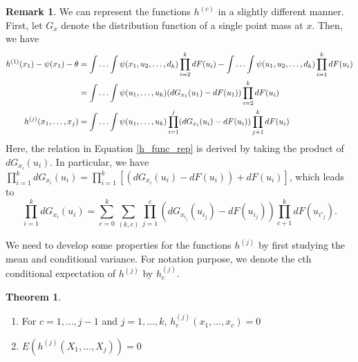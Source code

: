 \documentclass{article}
\theoremstyle{definition}
\newtheorem{theorem}{Theorem}
\numberwithin{Def}{section}
\newtheorem{Rmk}{Remark}
\begin{document}
\begin{Rmk}
We can represent the functions $h^{(c)}$ in a slightly different manner. First, let $G_x$ denote the distribution function of a single point mass at $x$. Then, we have 
\begin{align}
    h^{(1)}(x_1) - \psi(x_1) - \theta  &= \int \dotsc \int \psi(x_1, u_2, \dotsc, d_k)\prod_{i=2}^k dF(u_i) - \int \dotsc \int \psi(u_1, u_2, \dotsc, d_k)\prod_{i=1}^k dF(u_i) \notag \\
    &= \int \dotsc \int \psi(u_1, \dotsc, u_k)(dG_{x_1}(u_1) - dF(u_1))\prod_{i=2}^k dF(u_i) \notag \\
    h^{(j)}(x_1, \dotsc, x_j) &= \int \dotsc \int \psi(u_1, \dotsc, u_k) \prod_{i=1}^j(dG_{x_i}(u_i) - dF(u_i))\prod_{j+1}^kdF(u_i) \label{h_func_rep}
\end{align}
Here, the relation in Equation \ref{h_func_rep} is derived by taking the product of $dG_{x_i}(u_i)$. In particular, we have $\prod_{i=1}^kdG_{x_i}(u_i) = \prod_{i=1}^k\left[(dG_{x_i}(u_i) - dF(u_i)) + dF(u_i) \right]$, which leads to $$\prod_{i=1}^kdG_{x_i}(u_i) = \sum_{c=0}^k \sum_{(k,c)}\prod_{j=1}^c\left(dG_{x_{i_j}}(u_{i_j}) - dF(u_{i_j})\right)\prod_{c+1}^k dF(u_{i'_j}).$$
\end{Rmk}

We need to develop some properties for the functions $h^{(j)}$ by first studying the mean and conditional variance. For notation purpose, we denote the cth conditional expectation of $h^{(j)}$ by $h_c^{(j)}$.


\begin{theorem}
    \begin{enumerate} [label = (\roman*)]
        \item For $c = 1, \dotsc, j-1$ and $j = 1, \dotsc, k$, $h_c^{(j)}(x_1, \dotsc, x_c) = 0$
        \item $E(h^{(j)}(X_1, \dotsc, X_j)) = 0$
    \end{enumerate}
    \end{theorem}
    
\end{document}
